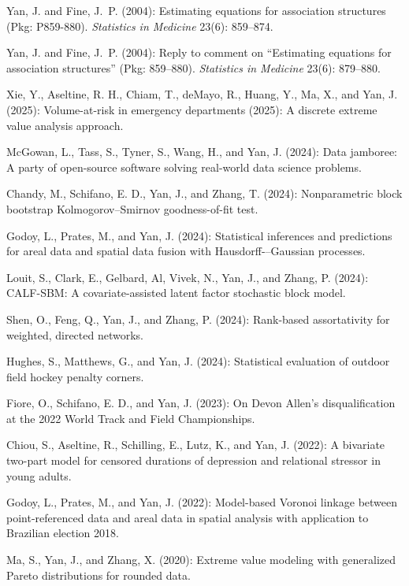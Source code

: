\documentclass[Statistics]{vita}
\begin{document}
\begin{vita}
\begin{Publications}
\begin{RefereedJournalArticles}
  \item Yan, J. and Fine, J.~P. (2004): Estimating equations for association structures ({P}kg: P859-880). {\em Statistics in Medicine\/} 23(6): 859--874.
  \item Yan, J. and Fine, J.~P. (2004): Reply to comment on ``Estimating equations for association structures'' ({P}kg: 859--880). {\em Statistics in Medicine\/} 23(6): 879--880.
  \end{RefereedJournalArticles}
  \begin{UnderReview}
  \item *Xie, Y., Aseltine, R.  H., Chiam, T.,  deMayo, R., Huang, Y., Ma, X., and Yan, J. (2025): Volume-at-risk in emergency departments (2025): A discrete extreme value analysis approach.
  \item McGowan, L., Tass, S., Tyner, S., Wang, H., and Yan, J. (2024): Data jamboree: A party of open-source software solving real-world data science problems.
  \item *Chandy, M., Schifano, E. D., Yan, J., and Zhang, T. (2024): Nonparametric block bootstrap Kolmogorov--Smirnov goodness-of-fit test.
  \item *Godoy, L., Prates, M., and Yan, J. (2024): Statistical inferences and predictions for areal data and spatial data fusion with Hausdorff-–Gaussian processes.
  \item *Louit, S., Clark, E., Gelbard, Al, Vivek, N., Yan, J., and Zhang, P. (2024): CALF-SBM: A covariate-assisted latent factor stochastic block model.
  \item Shen, O., Feng, Q., Yan, J., and Zhang, P. (2024): Rank-based assortativity for weighted, directed networks.
  \item *Hughes, S., Matthews, G., and Yan, J. (2024): Statistical evaluation of outdoor field hockey penalty corners.
  \item *Fiore, O., Schifano, E. D., and Yan, J. (2023): On Devon Allen’s disqualification at the 2022 World Track and Field Championships.
  \item Chiou, S., Aseltine, R., Schilling, E., Lutz, K., and Yan, J. (2022): A bivariate two-part model for censored durations of depression and relational stressor in young adults.
  \item *Godoy, L., Prates, M., and Yan, J. (2022): Model-based Voronoi linkage between point-referenced data and areal data in spatial analysis with application to Brazilian election 2018.
  \item *Ma, S., Yan, J., and Zhang, X. (2020): Extreme value modeling with generalized Pareto distributions for rounded data.

\end{UnderReview}
\end{Publications}
\end{vita}
\end{document}
